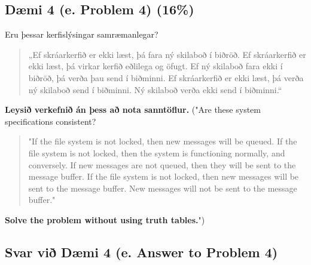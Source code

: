 \newpage
\subsection*{Dæmi 4 (e. Problem 4) (16\%) \label{section:daemi4}}
Eru þessar kerfislýsingar samræmanlegar? 
\begin{quote}
„Ef skráarkerfið er ekki læst, þá fara ný skilaboð í biðröð. Ef skráarkerfið er ekki læst, þá virkar kerfið eðlilega og öfugt. Ef ný skilaboð fara ekki í biðröð, þá verða þau send í biðminni. Ef skráarkerfið er ekki læst, þá verða ný skilaboð send í biðminni. Ný skilaboð verða ekki send í biðminni.“
\end{quote}
\textbf{Leysið verkefnið án þess að nota sanntöflur.}
\vspace{2mm} \newline
("Are these system specifications consistent? 
\begin{quote}
"If the file system is not locked, then new messages will be queued. If the file system is not locked, then the system is functioning normally, and conversely. If new messages are not queued, then they will be sent to the message buffer. If the file system is not locked, then new messages will be sent to the message buffer. New messages will not be sent to the message buffer." 
\end{quote}
\textbf{Solve the problem without using truth tables.}")

\subsection*{Svar við Dæmi 4 (e. Answer to Problem 4)}

\newcommand{\makeAnswerBoxProblemFour}{
  \noindent
  \begin{tcolorbox}[colframe=black, colback=white, boxrule=0.5pt, arc=0pt, outer arc=0pt, height=\dimexpr\textheight-\ht\strutbox-20\baselineskip\relax]

    
  \end{tcolorbox}
}

\makeAnswerBoxProblemFour